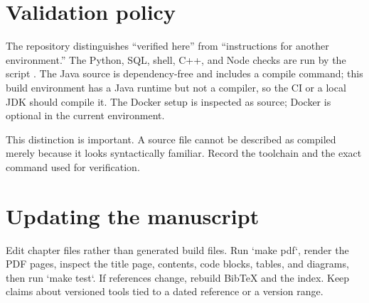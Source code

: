 \section{Validation policy}
The repository distinguishes “verified here” from “instructions for another
environment.” The Python, SQL, shell, C++, and Node checks are run by the script
. The Java source is dependency-free and includes a
compile command; this build environment has a Java runtime but not a compiler,
so the CI or a local JDK should compile it. The Docker setup is inspected as
source; Docker is optional in the current environment.

This distinction is important. A source file cannot be described as compiled
merely because it looks syntactically familiar. Record the toolchain and the
exact command used for verification.

\section{Updating the manuscript}
Edit chapter files rather than generated build files. Run `make pdf`, render the
PDF pages, inspect the title page, contents, code blocks, tables, and diagrams,
then run `make test`. If references change, rebuild BibTeX and the index. Keep
claims about versioned tools tied to a dated reference or a version range.
